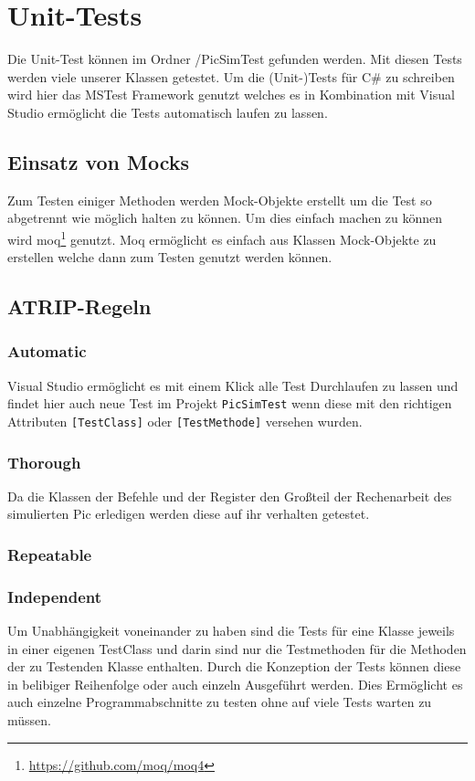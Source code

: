 \documentclass[12pt,a4paper,titlepage,ngerman,pdftex]{report}
\begin{document}
    \section{Unit-Tests}
    Die Unit-Test können im Ordner /PicSimTest gefunden werden. 
	Mit diesen Tests werden viele unserer Klassen getestet.
	Um die (Unit-)Tests für C\# zu schreiben wird hier das MSTest Framework genutzt welches es in Kombination mit Visual Studio ermöglicht die Tests automatisch laufen zu lassen.
    \subsection{Einsatz von Mocks}
    Zum Testen einiger Methoden werden Mock-Objekte erstellt um die Test so abgetrennt wie möglich halten zu können.
	Um dies einfach machen zu können wird moq\footnote{\url{https://github.com/moq/moq4}} genutzt.
	Moq ermöglicht es einfach aus Klassen Mock-Objekte zu erstellen welche dann zum Testen genutzt werden können.
	
    \subsection{ATRIP-Regeln}
	\label{subsec:atrip-regeln}

    \subsubsection{Automatic}
	Visual Studio ermöglicht es mit einem Klick alle Test Durchlaufen zu lassen und findet hier auch neue Test im Projekt \verb|PicSimTest| wenn diese mit den richtigen Attributen \verb|[TestClass]| oder \verb|[TestMethode]| versehen wurden.
	
    \subsubsection{Thorough}\label{subsec:thorough}
    Da die Klassen der Befehle und der Register den Großteil der Rechenarbeit des simulierten Pic erledigen werden diese auf ihr verhalten getestet.
    

    \subsubsection{Repeatable}

    \subsubsection{Independent}
	Um Unabhängigkeit voneinander zu haben sind die Tests für eine Klasse jeweils in einer eigenen TestClass und darin sind nur die Testmethoden für die Methoden der zu Testenden Klasse enthalten.
 	Durch die Konzeption der Tests können diese in belibiger Reihenfolge oder auch einzeln Ausgeführt werden. 
 	Dies Ermöglicht es auch einzelne Programmabschnitte zu testen ohne auf viele Tests warten zu müssen.
\end{document}

